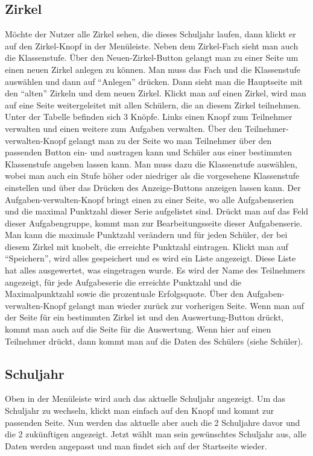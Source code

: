 \subsection{Zirkel}
Möchte der Nutzer alle Zirkel sehen, die dieses Schuljahr laufen, dann klickt er auf den Zirkel-Knopf in der Menüleiste. Neben dem Zirkel-Fach sieht man auch die Klassenstufe. Über den Neuen-Zirkel-Button gelangt man zu einer Seite um einen neuen Zirkel anlegen zu können. Man muss das Fach und die Klassenstufe auswählen und dann auf "`Anlegen"' drücken. Dann sieht man die Hauptseite mit den "`alten"' Zirkeln und dem neuen Zirkel. Klickt man auf einen Zirkel, wird man auf eine Seite weitergeleitet mit allen Schülern, die an diesem Zirkel teilnehmen. Unter der Tabelle befinden sich 3 Knöpfe. Links einen Knopf zum Teilnehmer verwalten und einen weitere zum Aufgaben verwalten. Über den Teilnehmer-verwalten-Knopf gelangt man zu der Seite wo man Teilnehmer über den passenden Button ein- und austragen kann und Schüler aus einer bestimmten Klassenstufe angeben lassen kann. Man muss dazu die Klassenstufe auswählen, wobei man auch ein Stufe höher oder niedriger als die vorgesehene Klassenstufe einstellen und über das Drücken des Anzeige-Buttons anzeigen lassen kann. Der Aufgaben-verwalten-Knopf bringt einen zu einer Seite, wo alle Aufgabenserien und die maximal Punktzahl dieser Serie aufgelistet sind. Drückt man auf das Feld dieser Aufgabengruppe, kommt man zur Bearbeitungsseite dieser Aufgabenserie. Man kann die maximale Punktzahl verändern und für jeden Schüler, der bei diesem Zirkel mit knobelt, die erreichte Punktzahl eintragen. Klickt man auf "`Speichern"', wird alles gespeichert und es wird ein Liste angezeigt. Diese Liste hat alles ausgewertet, was eingetragen wurde. Es wird der Name des Teilnehmers angezeigt, für jede Aufgabeserie die erreichte Punktzahl und die Maximalpunktzahl sowie die prozentuale Erfolgsquote. Über den Aufgaben-verwalten-Knopf gelangt man wieder zurück zur vorherigen Seite. Wenn man auf der Seite für ein bestimmten Zirkel ist und den Auswertung-Button drückt, kommt man auch auf die Seite für die Auswertung. Wenn hier auf einen Teilnehmer drückt, dann kommt man auf die Daten des Schülers (siehe Schüler).

\subsection{Schuljahr}
Oben in der Menüleiste wird auch das aktuelle Schuljahr angezeigt. Um das Schuljahr zu wechseln, klickt man einfach auf den Knopf und kommt zur passenden Seite. Nun werden das aktuelle aber auch die 2 Schuljahre davor und die 2 zukünftigen angezeigt. Jetzt wählt man sein gewünschtes Schuljahr aus, alle Daten werden angepasst und man findet sich auf der Startseite wieder.

